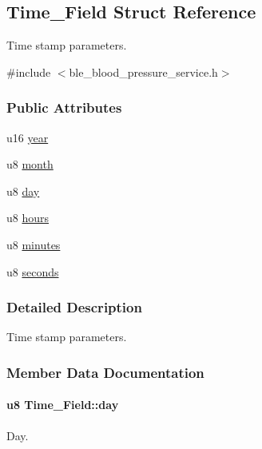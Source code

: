 \hypertarget{struct_time___field}{}\subsection{Time\+\_\+\+Field Struct Reference}
\label{struct_time___field}


Time stamp parameters.  




{\ttfamily \#include $<$ble\+\_\+blood\+\_\+pressure\+\_\+service.\+h$>$}

\subsubsection*{Public Attributes}
\begin{DoxyCompactItemize}
\item 
u16 \hyperlink{struct_time___field_ac960412ddea62601d0b51ef08db90706}{year}
\item 
u8 \hyperlink{struct_time___field_aabf7717ef45ee2a386e56d4c0f3cdc34}{month}
\item 
u8 \hyperlink{struct_time___field_a3a63cd6577e15ed24fc73da762abd97b}{day}
\item 
u8 \hyperlink{struct_time___field_a3bf813f88977f82786b2e42b2d8971bb}{hours}
\item 
u8 \hyperlink{struct_time___field_a96cacf608f484e0df0f0f30d6b0473c9}{minutes}
\item 
u8 \hyperlink{struct_time___field_aadcdd15bb55775e38af8d8ebfb0fe513}{seconds}
\end{DoxyCompactItemize}


\subsubsection{Detailed Description}
Time stamp parameters. 

\subsubsection{Member Data Documentation}
\paragraph[{\texorpdfstring{day}{day}}]{\setlength{\rightskip}{0pt plus 5cm}u8 Time\+\_\+\+Field\+::day}\hypertarget{struct_time___field_a3a63cd6577e15ed24fc73da762abd97b}{}\label{struct_time___field_a3a63cd6577e15ed24fc73da762abd97b}
Day. 
